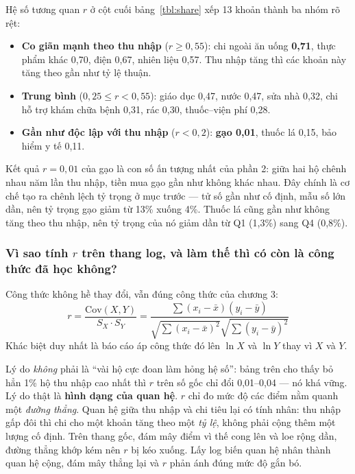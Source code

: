 \documentclass[11pt,a4paper]{article}
\newcommand{\n}[1]{\textbf{#1}}
\newcommand{\tblfit}[1]{\resizebox{\linewidth}{!}{}}
\begin{document}
Hệ số tương quan $r$ ở cột cuối bảng~\ref{tbl:share} xếp 13 khoản thành ba nhóm rõ rệt:

\begin{itemize}[leftmargin=1.2em,itemsep=2pt,topsep=2pt]
\item \n{Co giãn mạnh theo thu nhập} ($r \ge 0,55$): chi ngoài ăn uống \n{0,71}, thực phẩm khác 0,70, điện 0,67, nhiên liệu 0,57. Thu nhập tăng thì các khoản này tăng theo gần như tỷ lệ thuận.
\item \n{Trung bình} ($0,25 \le r < 0,55$): giáo dục 0,47, nước 0,47, sửa nhà 0,32, chi hỗ trợ khám chữa bệnh 0,31, rác 0,30, thuốc–viện phí 0,28.
\item \n{Gần như độc lập với thu nhập} ($r < 0,2$): \n{gạo 0,01}, thuốc lá 0,15, bảo hiểm y tế 0,11.
\end{itemize}

Kết quả $r = 0,01$ của gạo là con số ấn tượng nhất của phần 2: giữa hai hộ chênh nhau năm lần thu nhập, tiền mua gạo gần như không khác nhau. Đây chính là cơ chế tạo ra chênh lệch tỷ trọng ở mục trước — tử số gần như cố định, mẫu số lớn dần, nên tỷ trọng gạo giảm từ 13\% xuống 4\%. Thuốc lá cũng gần như không tăng theo thu nhập, nên tỷ trọng của nó giảm dần từ Q1 (1,3\%) sang Q4 (0,8\%).

\subsubsection{Vì sao tính $r$ trên thang log, và làm thế thì có còn là công thức đã học không?}\label{sec:logr}

Công thức không hề thay đổi, vẫn đúng công thức của chương 3:
\[ r = \frac{\mathrm{Cov}(X,Y)}{S_X \cdot S_Y} = \frac{\sum (x_i-\bar{x})(y_i-\bar{y})}{\sqrt{\sum (x_i-\bar{x})^2}\sqrt{\sum (y_i-\bar{y})^2}} \]
Khác biệt duy nhất là báo cáo áp công thức đó lên $\ln X$ và $\ln Y$ thay vì $X$ và $Y$.

\begin{table}[H]\centering\small
\caption{Cùng một cặp biến, tính $r$ theo hai cách, và kiểm tra độ vững khi bỏ 1\% hộ có thu nhập cao nhất}
\tblfit{t_r_scale}
\end{table}

Lý do \emph{không} phải là “vài hộ cực đoan làm hỏng hệ số”: bảng trên cho thấy bỏ hẳn 1\% hộ thu nhập cao nhất thì $r$ trên số gốc chỉ đổi 0,01–0,04 — nó khá vững. Lý do thật là \n{hình dạng của quan hệ}. $r$ chỉ đo mức độ các điểm nằm quanh một \emph{đường thẳng}. Quan hệ giữa thu nhập và chi tiêu lại có tính nhân: thu nhập gấp đôi thì chi cho một khoản tăng theo một \emph{tỷ lệ}, không phải cộng thêm một lượng cố định. Trên thang gốc, đám mây điểm vì thế cong lên và loe rộng dần, đường thẳng khớp kém nên $r$ bị kéo xuống. Lấy log biến quan hệ nhân thành quan hệ cộng, đám mây thẳng lại và $r$ phản ánh đúng mức độ gắn bó.
\end{document}
